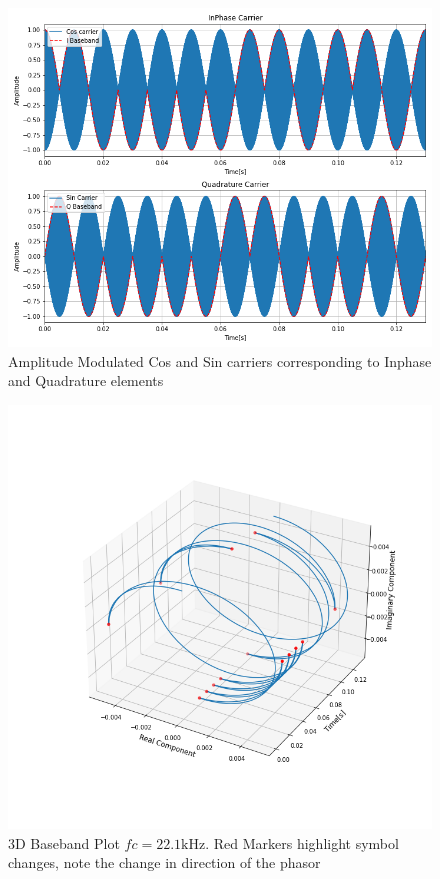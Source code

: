 \begin{figure}[h!]
    \centering
    \includegraphics[width = \textwidth]{figs/sim/carrier.png}
    \caption{\centering Amplitude Modulated Cos and Sin carriers corresponding to Inphase and Quadrature elements}
    \label{fig:carrier}
\end{figure}
\begin{figure}[h!]
    \centering
    \includegraphics[height = \textwidth]{figs/sim/3dbaseband.png}
    \caption{3D Baseband Plot $fc = 22.1\si{\kilo\hertz}$. \small{Red Markers highlight symbol changes, note the change in direction of the phasor}}
    \label{fig:3DBB}
\end{figure}

